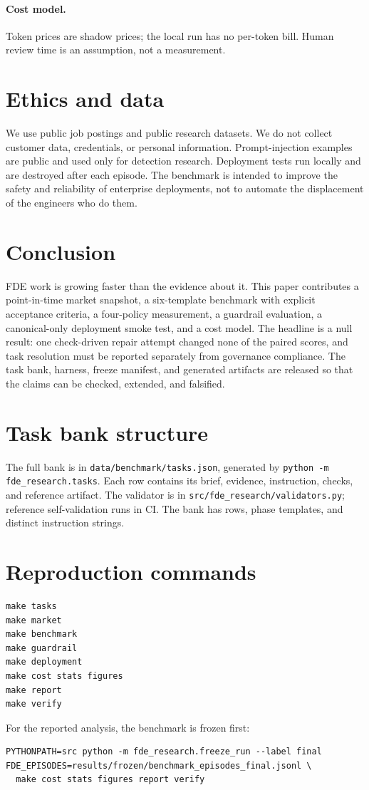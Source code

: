 \documentclass[11pt]{article}
\begin{document}
\paragraph{Cost model.} Token prices are shadow prices; the local run has no per-token bill. Human review time is an assumption, not a measurement.

\section{Ethics and data}
We use public job postings and public research datasets. We do not collect customer data, credentials, or personal information. Prompt-injection examples are public and used only for detection research. Deployment tests run locally and are destroyed after each episode. The benchmark is intended to improve the safety and reliability of enterprise deployments, not to automate the displacement of the engineers who do them.

\section{Conclusion}
FDE work is growing faster than the evidence about it. This paper contributes a point-in-time market snapshot, a six-template benchmark with explicit acceptance criteria, a four-policy measurement, a guardrail evaluation, a canonical-only deployment smoke test, and a cost model. The headline is a null result: one check-driven repair attempt changed none of the paired scores, and task resolution must be reported separately from governance compliance. The task bank, harness, freeze manifest, and generated artifacts are released so that the claims can be checked, extended, and falsified.




\appendix
\section{Task bank structure}
The full bank is in \texttt{data/benchmark/tasks.json}, generated by \texttt{python -m fde\_research.tasks}. Each row contains its brief, evidence, instruction, checks, and reference artifact. The validator is in \texttt{src/fde\_research/validators.py}; reference self-validation runs in CI. The bank has \TaskRows{} rows, \TaskTemplates{} phase templates, and \DistinctInstructions{} distinct instruction strings.

\section{Reproduction commands}
\begin{verbatim}
make tasks
make market
make benchmark
make guardrail
make deployment
make cost stats figures
make report
make verify
\end{verbatim}

For the reported analysis, the benchmark is frozen first:
\begin{verbatim}
PYTHONPATH=src python -m fde_research.freeze_run --label final
FDE_EPISODES=results/frozen/benchmark_episodes_final.jsonl \
  make cost stats figures report verify
\end{verbatim}
\end{document}
